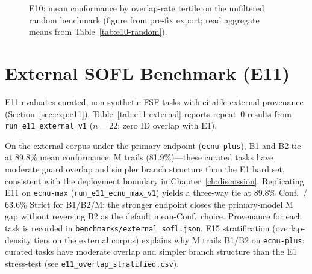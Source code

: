 \begin{figure}[t]
  \centering
  \caption{E10: mean conformance by overlap-rate tertile on the unfiltered random
    benchmark (figure from pre-fix export; read aggregate means from
    Table~\ref{tab:e10-random}).}
  \label{fig:e10-overlap}
\end{figure}

\section{External SOFL Benchmark (E11)}
\label{sec:results:e11}

E11 evaluates curated, non-synthetic FSF tasks with citable external provenance
(Section~\ref{sec:exp:e11}).
Table~\ref{tab:e11-external} reports repeat~0 results from
\texttt{run\_e11\_external\_v1} ($n{=}22$; zero ID overlap with E1).

\begin{table}[H]
  \caption{External SOFL benchmark (E11).  Hand-curated from textbook and IET
    pattern sources; not generated by \texttt{HardTaskGenerator}.}
  \label{tab:e11-external}
  \centering
\end{table}

On the external corpus under the primary endpoint (\texttt{ecnu-plus}),
B1 and B2 tie at 89.8\% mean conformance; M trails
(81.9\%)---these curated tasks have moderate guard overlap and simpler branch
structure than the E1 hard set, consistent with the deployment boundary in
Chapter~\ref{ch:discussion}.
Replicating E11 on \texttt{ecnu-max} (\texttt{run\_e11\_ecnu\_max\_v1}) yields
a three-way tie at 89.8\% Conf.\ / 63.6\% Strict for B1/B2/M: the stronger
endpoint closes the primary-model M gap without reversing B2 as the default
mean-Conf.\ choice.
Provenance for each task is recorded in \texttt{benchmarks/external\_sofl.json}.
E15 stratification (overlap-density tiers on the external corpus) explains why
M trails B1/B2 on \texttt{ecnu-plus}: curated tasks have moderate overlap and
simpler branch structure than the E1 stress-test
(see \texttt{e11\_overlap\_stratified.csv}).


